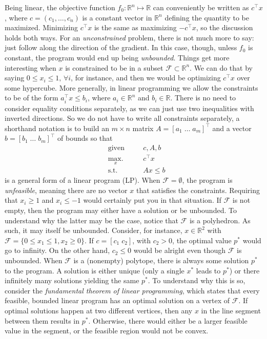 			Being linear, the objective function $f_0 : \mathbb{R}^n \mapsto \mathbb{R}$ can conveniently be written as $c^\intercal x$, where $c = (c_1, \ldots, c_n)$ is a constant vector in $\mathbb{R}^n$ defining the quantity to be maximized. Minimizing $c^\intercal x$ is the same as maximizing $-c^\intercal x$, so the discussion holds both ways. For an \emph{unconstrained} problem, there is not much more to say: just follow along the direction of the gradient. In this case, though, unless $f_0$ is constant, the program would end up being \emph{unbounded}. Things get more interesting when $x$ is constrained to be in a subset $\mathcal{F} \subset \mathbb{R}^n$. We can do that by saying $0 \leq x_i \leq 1, \,\forall i$, for instance, and then we would be optimizing $c^\intercal x$ over some hypercube. More generally, in linear programming we allow the constraints to be of the form $a_i^\intercal x \leq b_i$, where $a_i \in \mathbb{R}^n$ and $b_i \in \mathbb{R}$. There is no need to consider equality conditions separately, as we can just use two inequalities with inverted directions. So we do not have to write all constraints separately, a shorthand notation is to build an $m \times n$ matrix $A = [a_1 \; \ldots \; a_m]^\intercal$ and a vector $b = [b_1 \; \ldots \; b_m]^\intercal$ of bounds so that
			\begin{subequations}
				\begin{alignat}{2}
					&\text{given}    &\quad & c, A, b \\
					&\underset{x}{\text{max.}}   &	  & c^\intercal x \\
					&\text{s.t.}    &      & Ax \leq b 
				\end{alignat}
				\label{eq:lp}
			\end{subequations}
			is a general form of a linear program (LP). When $\mathcal{F} = \emptyset$, the program is \emph{unfeasible}, meaning there are no vector $x$ that satisfies the constraints. Requiring that $x_i \geq 1$ and $x_i \leq -1$ would certainly put you in that situation. If $\mathcal{F}$ is not empty, then the program may either have a solution or be unbounded. To understand why the latter may be the case, notice that $\mathcal{F}$ is a polyhedron. As such, it may itself be unbounded. Consider, for instance, $x \in \mathbb{R}^2$ with $\mathcal{F} = \{ 0 \leq x_1 \leq 1, x_2 \geq 0 \}$. If $c = [c_1 \; c_2]$, with $c_2 > 0$, the optimal value $p^*$ would go to infinity. On the other hand, $c_2 \leq 0$ would be alright even though $\mathcal{F}$ is unbounded. When $\mathcal{F}$ is a (nonempty) polytope, there is always some solution $p^*$ to the program. A solution is either unique (only a single $x^*$ leads to $p^*$) or there infinitely many solutions yielding the same $p^*$. To understand why this is so, consider the \emph{fundamental theorem of linear programming}, which states that every feasible, bounded linear program has an optimal solution on a vertex of $\mathcal{F}$. If optimal solutions happen at two different vertices, then any $x$ in the line segment between them results in $p^*$. Otherwise, there would either be a larger feasible value in the segment, or the feasible region would not be convex. 

